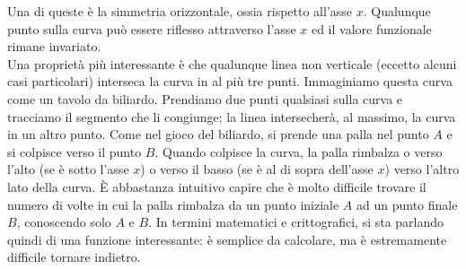Una di queste è la simmetria orizzontale, ossia rispetto all'asse $x$. Qualunque punto sulla curva può essere riflesso attraverso l'asse $x$ ed il valore funzionale rimane invariato.\\
Una proprietà più interessante è che qualunque linea non verticale (eccetto alcuni casi particolari) interseca la curva in al più tre punti. Immaginiamo questa curva come un tavolo da biliardo. Prendiamo due punti qualsiasi sulla curva e tracciamo il segmento che li congiunge; la linea intersecherà, al massimo, la curva in un altro punto. Come nel gioco del biliardo, si prende una palla nel punto $A$ e si colpisce verso il punto $B$. Quando colpisce la curva, la palla rimbalza o verso l'alto (se è sotto l'asse $x$) o verso il basso (se è al di sopra dell'asse $x$) verso l'altro lato della curva. È abbastanza intuitivo capire che è molto difficile trovare il numero di volte in cui la palla rimbalza da un punto iniziale $A$ ad un punto finale $B$, conoscendo solo $A$ e $B$. In termini matematici e crittografici, si sta parlando quindi di una funzione interessante: è semplice da calcolare, ma è estremamente difficile tornare indietro.

